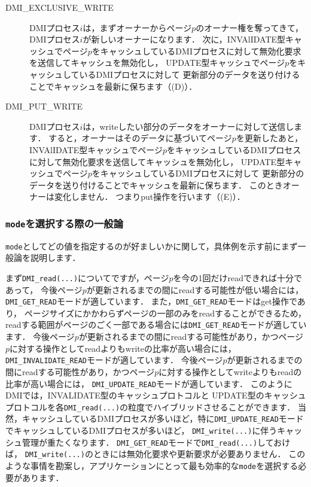 \documentclass[report,12pt]{jsbook}
\begin{document}
\begin{description}
\item[DMI\_EXCLUSIVE\_WRITE] DMIプロセス$i$は，まずオーナーからページ$p$のオーナー権を奪ってきて，
  DMIプロセス$i$が新しいオーナーになります．
  次に，INVAlIDATE型キャッシュでページ$p$をキャッシュしているDMIプロセスに対して無効化要求を送信してキャッシュを無効化し，
  UPDATE型キャッシュでページ$p$をキャッシュしているDMIプロセスに対して
  更新部分のデータを送り付けることでキャッシュを最新に保ちます（(D)）．
\item[DMI\_PUT\_WRITE] DMIプロセス$i$は，writeしたい部分のデータをオーナーに対して送信します．
  すると，オーナーはそのデータに基づいてページ$p$を更新したあと，
  INVAlIDATE型キャッシュでページ$p$をキャッシュしているDMIプロセスに対して無効化要求を送信してキャッシュを無効化し，
  UPDATE型キャッシュでページ$p$をキャッシュしているDMIプロセスに対して
  更新部分のデータを送り付けることでキャッシュを最新に保ちます．
  このときオーナーは変化しません．
  つまりput操作を行います（(E)）．
\end{description}


\subsubsection{\texttt{mode}を選択する際の一般論}

\texttt{mode}としてどの値を指定するのが好ましいかに関して，具体例を示す前にまず一般論を説明します．

まず\texttt{DMI\_read(...)}についてですが，ページ$p$を今の1回だけreadできれば十分であって，
今後ページ$p$が更新されるまでの間にreadする可能性が低い場合には，\texttt{DMI\_GET\_READ}モードが適しています．
また，\texttt{DMI\_GET\_READ}モードはget操作であり，
ページサイズにかかわらずページの一部のみをreadすることができるため，
readする範囲がページのごく一部である場合には\texttt{DMI\_GET\_READ}モードが適しています．
今後ページ$p$が更新されるまでの間にreadする可能性があり，かつページ$p$に対する操作としてreadよりもwriteの比率が高い場合には，
\texttt{DMI\_INVALIDATE\_READ}モードが適しています．
今後ページ$p$が更新されるまでの間にreadする可能性があり，かつページ$p$に対する操作としてwriteよりもreadの比率が高い場合には，
\texttt{DMI\_UPDATE\_READ}モードが適しています．
このようにDMIでは，INVALIDATE型のキャッシュプロトコルと
UPDATE型のキャッシュプロトコルを各\texttt{DMI\_read(...)}の粒度でハイブリッドさせることができます．
当然，キャッシュしているDMIプロセスが多いほど，特に\texttt{DMI\_UPDATE\_READ}モードでキャッシュしているDMIプロセスが多いほど，
\texttt{DMI\_write(...)}に伴うキャッシュ管理が重たくなります．
\texttt{DMI\_GET\_READ}モードで\texttt{DMI\_read(...)}しておけば，
\texttt{DMI\_write(...)}のときには無効化要求や更新要求が必要ありません．
このような事情を勘案し，アプリケーションにとって最も効率的な\texttt{mode}を選択する必要があります．
\end{document}
